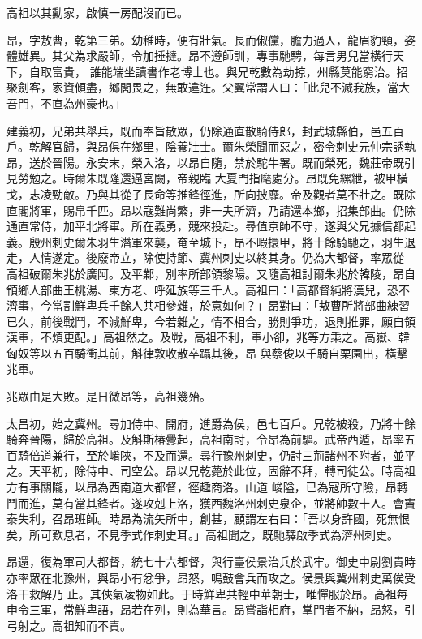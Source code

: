 \begin{pinyinscope}
 高祖以其勳家，啟慎一房配沒而已。



 昂，字敖曹，乾第三弟。幼稚時，便有壯氣。長而俶儻，膽力過人，龍眉豹頸，姿體雄異。其父為求嚴師，令加捶撻。昂不遵師訓，專事馳騁，每言男兒當橫行天下，自取富貴，
 誰能端坐讀書作老博士也。與兄乾數為劫掠，州縣莫能窮治。招聚劍客，家資傾盡，鄉閭畏之，無敢違迕。父翼常謂人曰：「此兒不滅我族，當大吾門，不直為州豪也。」



 建義初，兄弟共舉兵，既而奉旨散眾，仍除通直散騎侍郎，封武城縣伯，邑五百戶。乾解官歸，與昂俱在鄉里，陰養壯士。爾朱榮聞而惡之，密令刺史元仲宗誘執昂，送於晉陽。永安末，榮入洛，以昂自隨，禁於駝牛署。既而榮死，魏莊帝既引見勞勉之。時爾朱既隆還逼宮闕，帝親臨
 大夏門指麾處分。昂既免縲紲，被甲橫戈，志凌勁敵。乃與其從子長命等推鋒徑進，所向披靡。帝及觀者莫不壯之。既除直閣將軍，賜帛千匹。昂以寇難尚繁，非一夫所濟，乃請還本鄉，招集部曲。仍除通直常侍，加平北將軍。所在義勇，競來投赴。尋值京師不守，遂與父兄據信都起義。殷州刺史爾朱羽生潛軍來襲，奄至城下，昂不暇擐甲，將十餘騎馳之，羽生退走，人情遂定。後廢帝立，除使持節、冀州刺史以終其身。仍為大都督，率眾從
 高祖破爾朱兆於廣阿。及平鄴，別率所部領黎陽。又隨高祖討爾朱兆於韓陵，昂自領鄉人部曲王桃湯、東方老、呼延族等三千人。高祖曰：「高都督純將漢兒，恐不濟事，今當割鮮卑兵千餘人共相參雜，於意如何？」昂對曰：「敖曹所將部曲練習已久，前後戰鬥，不減鮮卑，今若雜之，情不相合，勝則爭功，退則推罪，願自領漢軍，不煩更配。」高祖然之。及戰，高祖不利，軍小卻，兆等方乘之。高嶽、韓匈奴等以五百騎衝其前，斛律敦收散卒躡其後，昂
 與蔡俊以千騎自栗園出，橫擊兆軍。



 兆眾由是大敗。是日微昂等，高祖幾殆。



 太昌初，始之冀州。尋加侍中、開府，進爵為侯，邑七百戶。兄乾被殺，乃將十餘騎奔晉陽，歸於高祖。及斛斯椿釁起，高祖南討，令昂為前驅。武帝西遁，昂率五百騎倍道兼行，至於崤陜，不及而還。尋行豫州刺史，仍討三荊諸州不附者，並平之。天平初，除侍中、司空公。昂以兄乾薨於此位，固辭不拜，轉司徒公。時高祖方有事關隴，以昂為西南道大都督，徑趣商洛。山道
 峻隘，已為寇所守險，昂轉鬥而進，莫有當其鋒者。遂攻剋上洛，獲西魏洛州刺史泉企，並將帥數十人。會竇泰失利，召昂班師。時昂為流矢所中，創甚，顧謂左右曰：「吾以身許國，死無恨矣，所可歎息者，不見季式作刺史耳。」高祖聞之，既馳驛啟季式為濟州刺史。



 昂還，復為軍司大都督，統七十六都督，與行臺侯景治兵於武牢。御史中尉劉貴時亦率眾在北豫州，與昂小有忿爭，昂怒，鳴鼓會兵而攻之。侯景與冀州刺史萬俟受洛干救解乃
 止。其俠氣凌物如此。于時鮮卑共輕中華朝士，唯憚服於昂。高祖每申令三軍，常鮮卑語，昂若在列，則為華言。昂嘗詣相府，掌門者不納，昂怒，引弓射之。高祖知而不責。




\end{pinyinscope}
